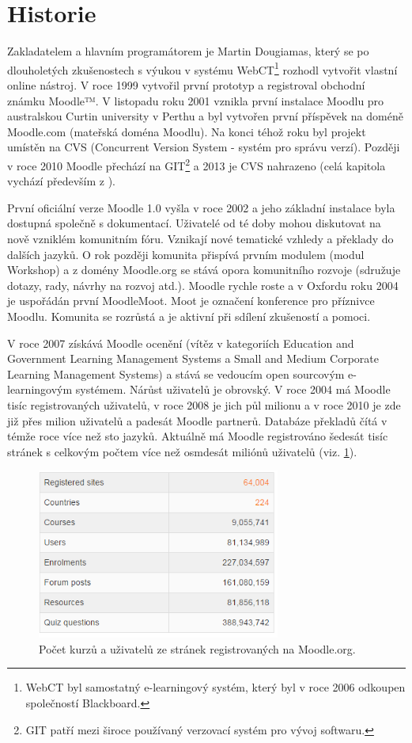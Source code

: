 \documentclass[
print,
  11pt,
  table,   
  nolof,    
  nolot,
  oneside,
  draft
]{fithesis3}
\begin{document}
	\section{Historie}
Zakladatelem a hlavním programátorem je Martin Dougiamas, který se po dlouholetých zkušenostech s výukou v systému WebCT\footnote{WebCT byl samostatný e-learningový systém, který byl v roce 2006 odkoupen společností Blackboard.}  rozhodl vytvořit vlastní online nástroj. V roce 1999 vytvořil první prototyp a registroval obchodní známku Moodle™. V listopadu roku 2001 vznikla první instalace Moodlu pro australskou Curtin university v Perthu a byl vytvořen první příspěvek na doméně Moodle.com (mateřská doména Moodlu).  Na konci téhož roku byl projekt umístěn na CVS (Concurrent Version System - systém pro správu verzí). Později v roce 2010 Moodle přechází na GIT\footnote{GIT patří mezi široce používaný verzovací systém pro vývoj softwaru.}  a 2013 je CVS nahrazeno (celá kapitola vychází především z \cite{history}).

První oficiální verze Moodle 1.0 vyšla v roce 2002 a jeho základní instalace byla dostupná společně s dokumentací. Uživatelé od té doby mohou diskutovat na nově vzniklém komunitním fóru. Vznikají nové tematické vzhledy a překlady do dalších jazyků. O rok později komunita přispívá prvním modulem (modul Workshop) a z domény Moodle.org se stává opora komunitního rozvoje (sdružuje dotazy, rady, návrhy na rozvoj atd.). Moodle rychle roste a v Oxfordu roku 2004 je uspořádán první MoodleMoot. Moot je označení konference pro příznivce Moodlu. Komunita se rozrůstá a je aktivní při sdílení zkušeností a pomoci.

V roce 2007 získává Moodle ocenění (vítěz v kategoriích Education and Government Learning Management Systems a Small and Medium Corporate Learning Management Systems) a stává se vedoucím open sourcovým e-learningovým systémem. Nárůst uživatelů je obrovský. V roce 2004 má Moodle tisíc registrovaných uživatelů, v roce 2008 je jich půl milionu a v roce 2010 je zde již přes milion uživatelů a padesát Moodle partnerů. Databáze překladů čítá v témže roce více než sto jazyků. Aktuálně má Moodle registrováno šedesát tisíc stránek s celkovým počtem více než osmdesát miliónů uživatelů (viz. \ref{fig:moodlestats}). 
 \begin{figure}
		  \begin{center}
		    \includegraphics[width=80mm]{images/statistiky-moodle.png}
		   \end{center}
		  \caption{Počet kurzů a uživatelů ze stránek registrovaných na Moodle.org.   \cite{moodle-stats}}
		  \label{fig:moodlestats}
		\end{figure}
\end{document}
